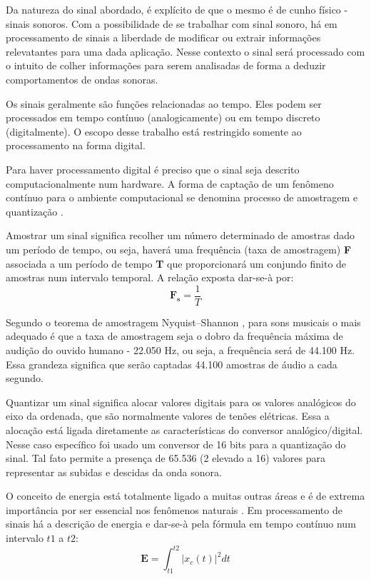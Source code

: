 Da natureza do sinal abordado, é explícito de que o mesmo é de cunho físico - sinais sonoros. Com a possibilidade de se trabalhar com sinal sonoro, há em processamento de sinais a liberdade de modificar ou extrair informações relevatantes para uma dada aplicação. Nesse contexto o sinal será processado com o intuito de colher informações para serem analisadas de forma a deduzir comportamentos de ondas sonoras.

Os sinais geralmente são funções relacionadas ao tempo. Eles podem ser processados em tempo contínuo (analogicamente) ou em tempo discreto (digitalmente). O escopo desse trabalho está restringido somente ao processamento na forma digital.

Para haver processamento digital é preciso que o sinal seja descrito computacionalmente num hardware. A forma de captação de um fenômeno contínuo para o ambiente computacional se denomina processo de amostragem e quantização \cite{amostragem}.

Amostrar um sinal significa recolher um número determinado de amostras dado um período de tempo, ou seja, haverá uma frequência (taxa de amostragem) \textbf{F} associada a um período de tempo \textbf{T} que proporcionará um conjundo finito de amostras num intervalo temporal. A relação exposta dar-se-à por:
\begin{equation}
\label{eqn05}
	\mathbf{F_s} = \frac{1}{T}
\end{equation}

Segundo o teorema de amostragem Nyquist–Shannon \cite{Nyquist}, para sons musicais o mais adequado é que a taxa de amostragem seja o dobro da frequência máxima de audição do ouvido humano - 22.050 Hz, ou seja, a frequência será de 44.100 Hz. Essa grandeza significa que serão captadas 44.100 amostras de áudio a cada segundo.

Quantizar um sinal significa alocar valores digitais para os valores analógicos do eixo da ordenada, que são normalmente valores de tenões elétricas. Essa a alocação está ligada diretamente as características do conversor analógico/digital. Nesse caso específico foi usado um conversor de 16 bits para a quantização do sinal. Tal fato permite a presença de 65.536 (2 elevado a 16) valores para representar as subidas e descidas da onda sonora.

O conceito de energia está totalmente ligado a muitas outras áreas e é de extrema importância por ser essencial nos fenômenos naturais \cite{oppenheim}. Em processamento de sinais há a descrição de energia e dar-se-à pela fórmula em tempo contínuo num intervalo \textbf{$t1$} a \textbf{$t2$}:
\begin{equation}
\label{eqn06}
	\mathbf{E} = \int_{t1}^{t2}{|x_c(t)|^{2}dt}
\end{equation}

